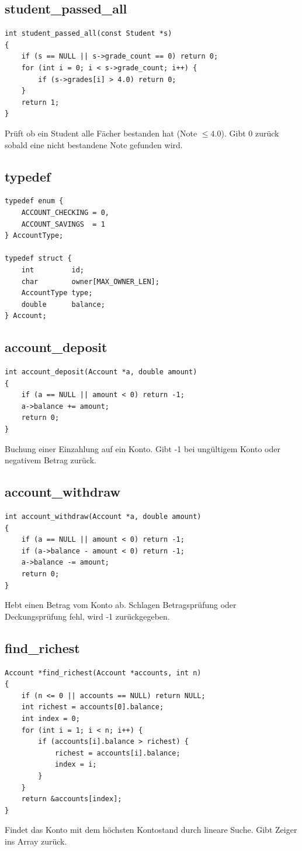 \documentclass[10pt, a4paper]{article}
\begin{document}
\subsection{student\_passed\_all}
\begin{lstlisting}
int student_passed_all(const Student *s)
{
    if (s == NULL || s->grade_count == 0) return 0;
    for (int i = 0; i < s->grade_count; i++) {
        if (s->grades[i] > 4.0) return 0;
    }
    return 1;
}
\end{lstlisting}
Pr\"uft ob ein Student alle F\"acher bestanden hat (Note $\leq 4.0$). Gibt 0 zur\"uck sobald eine nicht bestandene Note gefunden wird.

\subsection{typedef}
\begin{lstlisting}
typedef enum {
    ACCOUNT_CHECKING = 0,
    ACCOUNT_SAVINGS  = 1
} AccountType;

typedef struct {
    int         id;
    char        owner[MAX_OWNER_LEN];
    AccountType type;
    double      balance;
} Account;
\end{lstlisting}

\subsection{account\_deposit}
\begin{lstlisting}
int account_deposit(Account *a, double amount)
{
    if (a == NULL || amount < 0) return -1;
    a->balance += amount;
    return 0;
}
\end{lstlisting}
Buchung einer Einzahlung auf ein Konto. Gibt -1 bei ung\"ultigem Konto oder negativem Betrag zur\"uck.

\subsection{account\_withdraw}
\begin{lstlisting}
int account_withdraw(Account *a, double amount)
{
    if (a == NULL || amount < 0) return -1;
    if (a->balance - amount < 0) return -1;
    a->balance -= amount;
    return 0;
}
\end{lstlisting}
Hebt einen Betrag vom Konto ab. Schlagen Betragspr\"ufung oder Deckungspr\"ufung fehl, wird -1 zur\"uckgegeben.

\subsection{find\_richest}
\begin{lstlisting}
Account *find_richest(Account *accounts, int n)
{
    if (n <= 0 || accounts == NULL) return NULL;
    int richest = accounts[0].balance;
    int index = 0;
    for (int i = 1; i < n; i++) {
        if (accounts[i].balance > richest) {
            richest = accounts[i].balance;
            index = i;
        }
    }
    return &accounts[index];
}
\end{lstlisting}
Findet das Konto mit dem h\"ochsten Kontostand durch lineare Suche. Gibt Zeiger ins Array zur\"uck.
\end{document}
